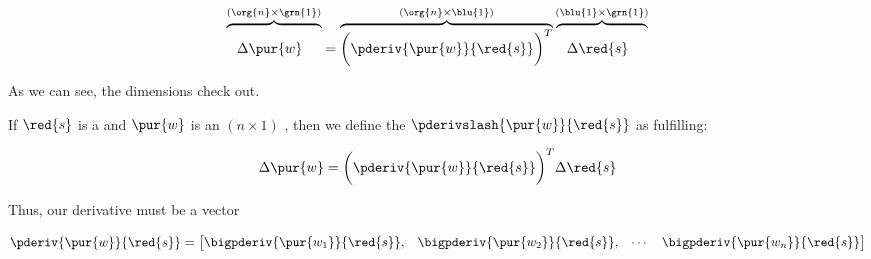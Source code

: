         \begin{equation}
            \overbrace{
                \phantom{\bigg(}
                    \Delta \pur{w}
                \phantom{\bigg)^T}
            }^{ (\org{n} \times \grn{1}) }
            =
            \overbrace{
                \bigg(
                    \pderiv{ \pur{w} }{ \red{s} } 
                \bigg)^T
            }^{ (\org{n} \times \blu{1}) }
            \overbrace{
                \phantom{\bigg(}
                    \Delta \red{s}
                \phantom{\bigg)^T}
            }^{ (\blu{1} \times \grn{1}) }
        \end{equation}
        
        As we can see, the dimensions check out.\\
        
        \begin{definition}
            If $\red{s}$ is a  and $\pur{w}$ is an $(n \times 1)$ , then we define the  $\pderivslash{ \pur{w} }{ \red{s} }$ as fulfilling:
            
            \begin{equation*}
                \Delta \pur{w}
                =
                \bigg(
                    \pderiv{ \pur{w} }{ \red{s} } 
                \bigg)^T
                \Delta \red{s}
            \end{equation*}
            
            Thus, our derivative must be a  vector
            
            \begin{equation*}
                \pderiv{ \pur{w} }{ \red{s} } 
                =
                \begin{bmatrix}
                    \bigpderiv{ \pur{w_1} }{ \red{s} }, &
                    \bigpderiv{ \pur{w_2} }{ \red{s} }, &
                    \cdots &
                    \bigpderiv{ \pur{w_n} }{ \red{s} } 
                \end{bmatrix}
            \end{equation*}
        \end{definition}
    